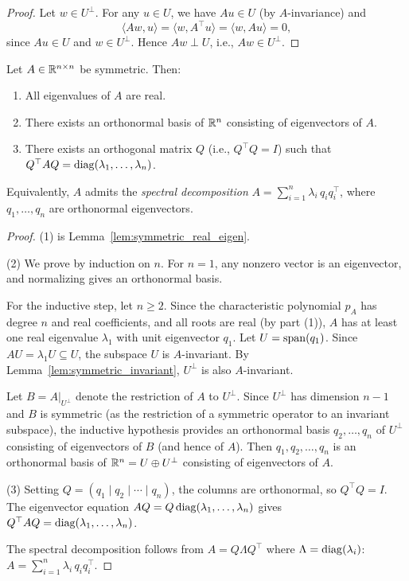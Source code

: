 \documentclass[11pt,a4paper]{article}
\begin{document}
\begin{proof}
Let $w \in U^\perp$.  For any $u \in U$, we have $Au \in U$ (by
$A$-invariance) and
\[
  \langle Aw, u \rangle = \langle w, A^\top u \rangle
  = \langle w, Au \rangle = 0,
\]
since $Au \in U$ and $w \in U^\perp$.  Hence $Aw \perp U$, i.e.,
$Aw \in U^\perp$.
\end{proof}

\begin{keyresult}[title={The Spectral Theorem for Real Symmetric Matrices}]
\begin{theorem}
\label{thm:spectral}
Let $A \in \mathbb{R}^{n \times n}$ be symmetric.  Then:
\begin{enumerate}[nosep]
  \item All eigenvalues of $A$ are real.
  \item There exists an orthonormal basis of $\mathbb{R}^n$ consisting of
        eigenvectors of $A$.
  \item There exists an orthogonal matrix $Q$ (i.e., $Q^\top Q = I$)
        such that $Q^\top A Q = \operatorname{diag}(\lambda_1, \ldots, \lambda_n)$.
\end{enumerate}
Equivalently, $A$ admits the \emph{spectral decomposition}
$A = \sum_{i=1}^{n} \lambda_i\, q_i q_i^\top$, where
$q_1, \ldots, q_n$ are orthonormal eigenvectors.
\end{theorem}
\end{keyresult}

\begin{proof}
(1) is Lemma~\ref{lem:symmetric_real_eigen}.

(2) We prove by induction on $n$.  For $n = 1$, any nonzero vector is
an eigenvector, and normalizing gives an orthonormal basis.

For the inductive step, let $n \geq 2$.  Since the characteristic
polynomial $p_A$ has degree $n$ and real coefficients, and all roots
are real (by part (1)), $A$ has at least one real eigenvalue $\lambda_1$
with unit eigenvector $q_1$.  Let $U = \operatorname{span}(q_1)$.  Since
$AU = \lambda_1 U \subseteq U$, the subspace $U$ is $A$-invariant.
By Lemma~\ref{lem:symmetric_invariant}, $U^\perp$ is also $A$-invariant.

Let $B = A|_{U^\perp}$ denote the restriction of $A$ to $U^\perp$.
Since $U^\perp$ has dimension $n - 1$ and $B$ is symmetric (as the
restriction of a symmetric operator to an invariant subspace), the
inductive hypothesis provides an orthonormal basis
$q_2, \ldots, q_n$ of $U^\perp$ consisting of eigenvectors of $B$
(and hence of $A$).  Then $q_1, q_2, \ldots, q_n$ is an orthonormal
basis of $\mathbb{R}^n = U \oplus U^\perp$ consisting of eigenvectors of $A$.

(3) Setting $Q = (q_1 \mid q_2 \mid \cdots \mid q_n)$, the columns are
orthonormal, so $Q^\top Q = I$.  The eigenvector equation
$AQ = Q\operatorname{diag}(\lambda_1, \ldots, \lambda_n)$ gives
$Q^\top A Q = \operatorname{diag}(\lambda_1, \ldots, \lambda_n)$.

The spectral decomposition follows from $A = Q\Lambda Q^\top$ where
$\Lambda = \operatorname{diag}(\lambda_i)$:
$A = \sum_{i=1}^n \lambda_i\, q_i q_i^\top$.
\end{proof}
\end{document}
